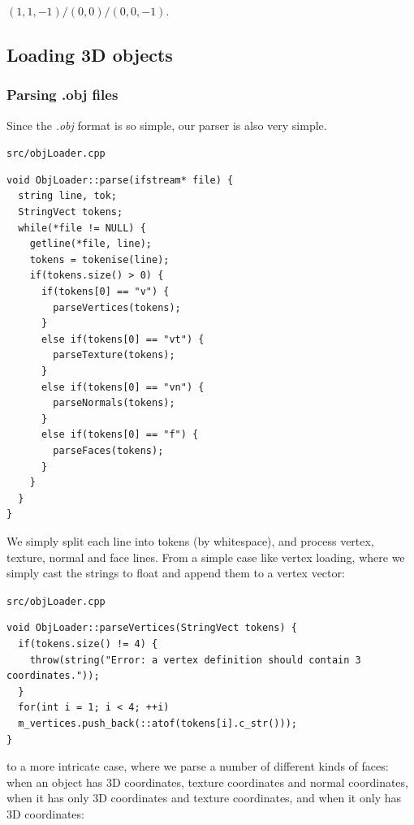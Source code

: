 \documentclass{scrartcl}
\begin{document}
$(1, 1, -1) / (0, 0) / (0, 0, -1)$.

\subsection{Loading 3D objects}
\subsubsection{Parsing .obj files}

Since the \textit{.obj} format is so simple, our parser is also very simple.

\lstinline{src/objLoader.cpp}
\begin{lstlisting}
void ObjLoader::parse(ifstream* file) {
  string line, tok;
  StringVect tokens;
  while(*file != NULL) {
    getline(*file, line);
    tokens = tokenise(line);
    if(tokens.size() > 0) {
      if(tokens[0] == "v") {
        parseVertices(tokens);
      }
      else if(tokens[0] == "vt") {
        parseTexture(tokens);
      }
      else if(tokens[0] == "vn") {
        parseNormals(tokens);
      }
      else if(tokens[0] == "f") {
        parseFaces(tokens);
      } 
    }
  }
}
\end{lstlisting}

We simply split each line into tokens (by whitespace), and process vertex, texture, normal and face lines. From a simple case like vertex loading, where we simply cast the strings to float and append them to a vertex vector:

\lstinline{src/objLoader.cpp}
\begin{lstlisting}
void ObjLoader::parseVertices(StringVect tokens) {
  if(tokens.size() != 4) {
    throw(string("Error: a vertex definition should contain 3 coordinates."));
  }
  for(int i = 1; i < 4; ++i)
  m_vertices.push_back(::atof(tokens[i].c_str()));
}
\end{lstlisting}

to a more intricate case, where we parse a number of different kinds of faces: when an object has 3D coordinates, texture coordinates and normal coordinates, when it has only 3D coordinates and texture coordinates, and when it only has 3D coordinates:

\pagebreak
\end{document}

